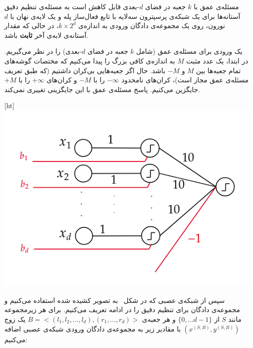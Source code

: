 مسئله‌ی عمق با $k$ جعبه در فضای $d$-بعدی قابل کاهش است به مسئله‌ی تنظیم دقیق آستانه‌ها برای یک شبکه‌ی پرسپترون سه‌لایه با تابع فعال‌ساز پله و یک لایه‌ی نهان با $d$ نورون، روی یک مجموعه‌ی دادگان ورودی به اندازه‌ی $k \times 2^d$، در حالی که مقدار آستانه‌ی لایه‌ی آخر \textbf{ثابت} باشد.

یک ورودی برای مسئله‌ی عمق (شامل $k$ جعبه در فضای $d$-بعدی) را در نظر می‌گیریم. در ابتدا، یک عدد مثبت $M$ به اندازه‌ی کافی بزرگ را پیدا می‌کنیم که مختصات گوشه‌های تمام جعبه‌ها بین $M$ و $-M$ باشد. حال اگر جعبه‌هایی بی‌کران داشتیم (که طبق تعریف مسئله‌ی عمق مجاز است)، کران‌های نامحدود $-\infty$ را با $-M$ و کران‌های $+\infty$ را با $+M$ جایگزین می‌کنیم. پاسخ مسئله‌ی عمق با این جایگزینی تغییری نمی‌کند.


[ht]
\centering
\includegraphics[scale=0.5]{figs/reductionKnownThreshold.png}

سپس از شبکه‌ی عصبی که در شکل~ به تصویر کشیده شده استفاده می‌کنیم و مجموعه‌ی دادگان برای تنظیم دقیق را در ادامه تعریف می‌کنیم. برای هر زیرمجموعه مانند $S$ از
$\{0, \dots d-1\}$
و هر جعبه‌ی
${B= <(l_1, l_2, ..., l_d), (r_1, ..., r_d)>}$
یک زوج $(x^{(S, B)}, y^{(S, B)})$ با مقادیر زیر به مجموعه‌ی دادگان ورودی شبکه‌ی عصبی اضافه می‌کنیم:


